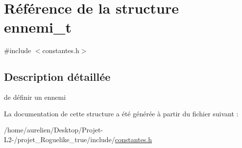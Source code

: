 \hypertarget{structennemi__t}{}\section{Référence de la structure ennemi\+\_\+t}
\label{structennemi__t}


{\ttfamily \#include $<$constantes.\+h$>$}



\subsection{Description détaillée}
de définir un ennemi 

La documentation de cette structure a été générée à partir du fichier suivant \+:\begin{DoxyCompactItemize}
\item 
/home/aurelien/\+Desktop/\+Projet-\/\+L2-\//projet\+\_\+\+Roguelike\+\_\+true/include/\hyperlink{constantes_8h}{constantes.\+h}\end{DoxyCompactItemize}
